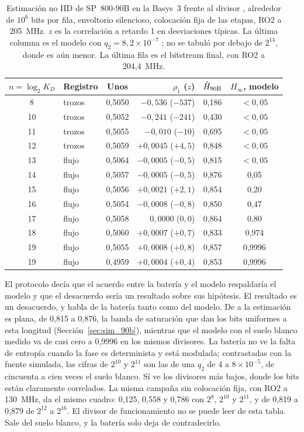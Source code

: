 \begin{table}[htbp]
\centering
\caption{Estimación no IID de SP~800-90B en la Basys~3 frente al divisor
\meas{}, alrededor de $10^6$ bits por fila, envoltorio silencioso,
colocación fija de las etapas, RO2 a 205~MHz. $z$ es la correlación a
retardo 1 en desviaciones típicas. La última columna es el modelo con
$q_2 = 8{,}2\times10^{-7}$ \est{}; no se tabuló por debajo de $2^{14}$,
donde es aún menor. La última fila es el bitstream final, con RO2 a
204,4~MHz.}
\label{tab:fpga_90b}
\small
\begin{tabular}{@{}clcrcc@{}}
\toprule
$n = \log_2 K_D$ & Registro & Unos & $\rho_1$ ($z$) & $\hat{H}_{\mathrm{90B}}$ & $H_\infty$, modelo \\
\midrule
8  & trozos & 0,5050 & $-0{,}536$ ($-537$)      & 0,186 & $<0{,}05$ \\
10 & trozos & 0,5052 & $-0{,}241$ ($-241$)      & 0,430 & $<0{,}05$ \\
11 & trozos & 0,5055 & $-0{,}010$ ($-10$)       & 0,695 & $<0{,}05$ \\
12 & trozos & 0,5059 & $+0{,}0045$ ($+4{,}5$)   & 0,848 & $<0{,}05$ \\
13 & flujo  & 0,5064 & $-0{,}0005$ ($-0{,}5$)   & 0,815 & $<0{,}05$ \\
14 & flujo  & 0,5057 & $-0{,}0005$ ($-0{,}5$)   & 0,876 & 0,05 \\
15 & flujo  & 0,5056 & $+0{,}0021$ ($+2{,}1$)   & 0,854 & 0,20 \\
16 & flujo  & 0,5054 & $-0{,}0008$ ($-0{,}8$)   & 0,850 & 0,47 \\
17 & flujo  & 0,5058 & $0{,}0000$ ($0{,}0$)     & 0,864 & 0,80 \\
18 & flujo  & 0,5060 & $+0{,}0007$ ($+0{,}7$)   & 0,833 & 0,974 \\
19 & flujo  & 0,5055 & $+0{,}0008$ ($+0{,}8$)   & 0,857 & 0,9996 \\
\midrule
19 & flujo  & 0,4959 & $+0{,}0004$ ($+0{,}4$)   & 0,853 & 0,9996 \\
\bottomrule
\end{tabular}
\end{table}

El protocolo decía que el acuerdo entre la batería y el modelo
respaldaría el modelo y que el desacuerdo sería un resultado sobre sus
hipótesis. El resultado es un desacuerdo, y habla de la batería tanto
como del modelo. De  a  la estimación es plana, de 0,815 a
0,876, la banda de saturación que dan los bits uniformes a esta longitud
(Sección~\ref{sec:sim_90b}), mientras que el modelo con el suelo blanco
medido va de casi cero a 0,9996 en los mismos divisores. La batería no ve
la falta de entropía cuando la fase es determinista y está modulada;
contrastadas con la fuente simulada, las cifras de $2^{10}$ y $2^{11}$
son las de una $q_2$ de 4 a $8\times10^{-5}$, de cincuenta a cien veces
el suelo blanco. Sí ve los divisores más bajos, donde los bits están
claramente correlados. La misma campaña sin colocación fija, con RO2 a
130~MHz, da el mismo cuadro: 0,125, 0,558 y 0,786 con $2^{8}$, $2^{10}$ y
$2^{11}$, y de 0,819 a 0,879 de $2^{12}$ a $2^{16}$. El divisor de
funcionamiento no se puede leer de esta tabla. Sale del suelo blanco, y
la batería solo deja de contradecirlo.

